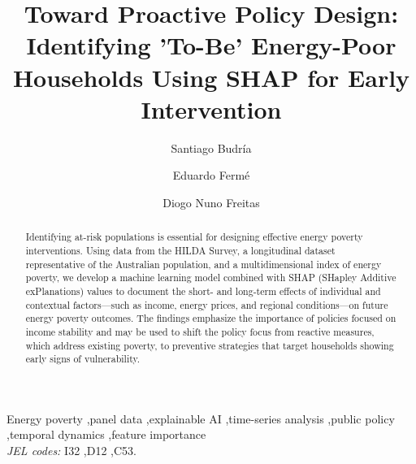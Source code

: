 \documentclass[preprint,authoryear,12pt]{elsarticle}
\begin{document}
\begin{frontmatter}

\title{Toward Proactive Policy Design: Identifying 'To-Be' Energy-Poor Households Using SHAP for Early Intervention}

\author[Nebrija,CEEAplA]{Santiago Budría}

\author[addressUMa,addressNOVALINCS]{Eduardo Fermé}

\author[addressUMa,addressNOVALINCS,addressITI]{Diogo Nuno Freitas}


\address[Nebrija] {Universidad Antonio de Nebrija, Spain}
\address[CEEAplA] {Centro de Estudos de Economia Aplicada do Atlântico (CEEAplA), Portugal}
\address[addressUMa]{Universidade da Madeira\\ Campus Universit\'ario da Penteada, 9020-105 Funchal, Portugal}
\address[addressNOVALINCS]{NOVA Laboratory for Computer Science and Informatics (NOVA LINCS), Portugal}
\address[addressITI]{Interactive Technologies Institute (ITI/LARSyS and ARDITI),Portugal}



\begin{abstract}
Identifying at-risk populations is essential for designing effective energy poverty interventions. Using data from the HILDA Survey, a longitudinal dataset representative of the Australian population, and a multidimensional index of energy poverty, we develop a machine learning model combined with SHAP (SHapley Additive exPlanations) values to document the short- and long-term effects of individual and contextual factors—such as income, energy prices, and regional conditions—on future energy poverty outcomes. The findings emphasize the importance of policies focused on income stability and may be used to shift the policy focus from reactive measures, which address existing poverty, to preventive strategies that target households showing early signs of vulnerability.
\end{abstract}

\begin{keyword}
Energy poverty \sep panel data \sep explainable AI \sep time-series analysis \sep public policy \sep temporal dynamics \sep feature importance
\\
\textit{JEL codes:} I32 \sep D12 \sep C53.
\end{keyword}


\end{frontmatter}
\end{document}

